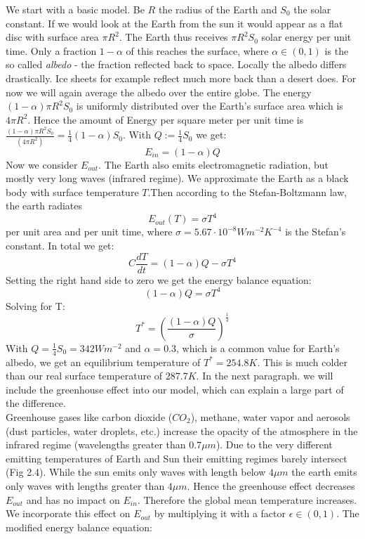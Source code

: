 \documentclass[%
thesis=student,%
coverpage=false,%
titlepage=false,%
headmarks=true, %
german,%
font=libertine, %
math=newpxtx, %
BCOR=5mm,%
coverBCOR=11mm%
]{tumbook}
\begin{document}
We start with a basic model.
Be $R$ the radius of the Earth and $S_{0}$ the solar constant. If we would look at the Earth from the sun it would appear as a flat disc with surface area $\pi R^2$. The Earth thus receives $\pi R^2 S_{0}$ solar energy per unit time. Only a fraction $1-\alpha$ of this reaches the surface, where $\alpha \in (0,1)$ is the so called \textit{albedo} - the fraction reflected back to space. Locally the albedo differs drastically. Ice sheets for example reflect much more back than a desert does. For now we will again average the albedo over the entire globe. The energy $(1-\alpha)\pi R^2S_{0}$ is uniformly distributed over the Earth's surface area which is $4\pi R^2$. Hence the amount of Energy per square meter per unit time is $\frac{(1-\alpha)\pi R^2S_{0}}{(4\pi R^2)} = \frac{1}{4}(1-\alpha)S_{0}$. With $Q:=\frac{1}{4}S_{0}$ we get: 
\begin{equation}
    E_{in} = (1-\alpha)Q
\end{equation}
Now we consider $E_{out}$. The Earth also emits electromagnetic radiation, but mostly very long waves (infrared regime). We approximate the Earth as a black body with surface temperature $T$.Then according to the Stefan-Boltzmann law, the earth radiates 
\begin{equation}
    E_{out}(T) = \sigma T^4
\end{equation}
per unit area and per unit time, where $\sigma = 5.67 \cdot 10^{-8}Wm^{-2}K^{-4}$ is the Stefan's constant. In total we get: 
\begin{equation}
    C\frac{dT}{dt} = (1-\alpha)Q - \sigma T^4
\end{equation}
Setting the right hand side to zero we get the energy balance equation: 
\begin{equation}
    (1-\alpha)Q = \sigma T^4
\end{equation}
Solving for T: 
\begin{equation}
    T^* = (\frac{(1-\alpha)Q}{\sigma})^\frac{1}{4}
\end{equation}
With $Q = \frac{1}{4}S_{0}= 342 Wm^{-2}$ and $\alpha = 0.3$, which is a common value for Earth's albedo, we get an equilibrium temperature of $T^* = 254.8K$. This is much colder than our real surface temperature of $287.7K$. In the next paragraph. we will include the greenhouse effect into our model, which can explain a large part of the difference.
\\ 
Greenhouse gases like carbon dioxide ($CO_{2}$), methane, water vapor and aerosols (dust particles, water droplets, etc.) increase the opacity of the atmosphere in the infrared regime (wavelengths greater than $0.7 \mu m$). Due to the very different emitting temperatures of Earth and Sun their emitting regimes barely intersect (Fig 2.4). While the sun emits only waves with length below $4 \mu m$ the earth emits only waves with lengths greater than $4 \mu m$. Hence the greenhouse effect decreases $E_{out}$ and has no impact on $E_{in}$. Therefore the global mean temperature increases. We incorporate this effect on $E_{out}$ by multiplying it with a factor $\epsilon \in (0,1)$. The modified energy balance equation: 
\end{document}
